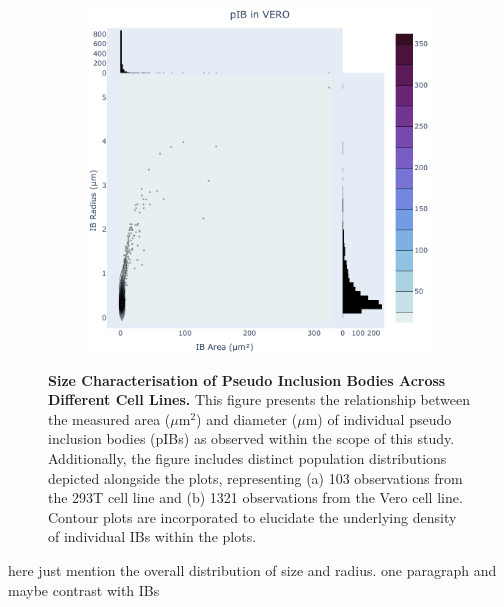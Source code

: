 \begin{figure}
\begin{subfigure}{0.495\textwidth}
        \includegraphics[width=\textwidth]{09. Chapter 4/Figs/01. pIB/01. pIB characterisation/02. heatmap_pib-vero.pdf}
    \end{subfigure}
    \caption[Size Characterisation of Pseudo Inclusion Bodies Across Different Cell Lines.]{\textbf{Size Characterisation of Pseudo Inclusion Bodies Across Different Cell Lines.} This figure presents the relationship between the measured area (\(\mu \mbox{m}^2\)) and diameter (\(\mu \mbox{m}\)) of individual pseudo inclusion bodies (pIBs) as observed within the scope of this study. Additionally, the figure includes distinct population distributions depicted alongside the plots, representing (a) 103 observations from the 293T cell line and (b) 1321 observations from the Vero cell line. Contour plots are incorporated to elucidate the underlying density of individual IBs within the plots.}
    \label{fig:Size Characterisation of Pseudo Inclusion Bodies Across Different Cell Lines}
\end{figure}


here just mention the overall distribution of size and radius. one paragraph and maybe contrast with IBs

